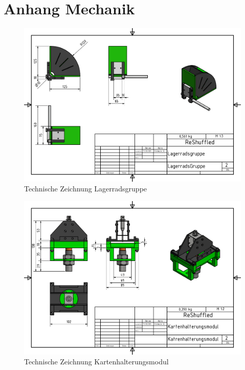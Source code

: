 \renewcommand\appendixname{Anhang}
\renewcommand\appendixpagename{Anhang}
\renewcommand\appendixtocname{Anhang}

\lohead{}

\appendix
\begingroup
\makeatletter
\let\ps@plain\ps@empty
\appendixpage
\makeatother
\endgroup

\chapter{Anhang Mechanik}

\begin{figure}[hb]
    \centering
    \includegraphics[scale=0.85,page=1]{fig/mech/LagerradsGruppe.pdf}
    \caption{Technische Zeichnung Lagerradsgruppe}
\end{figure}

\begin{figure}[hb]
    \centering
    \includegraphics[scale=0.85,page=1]{fig/mech/Katrenhalterungsmodul.pdf}
    \caption{Technische Zeichnung Kartenhalterungsmodul}
\end{figure}

